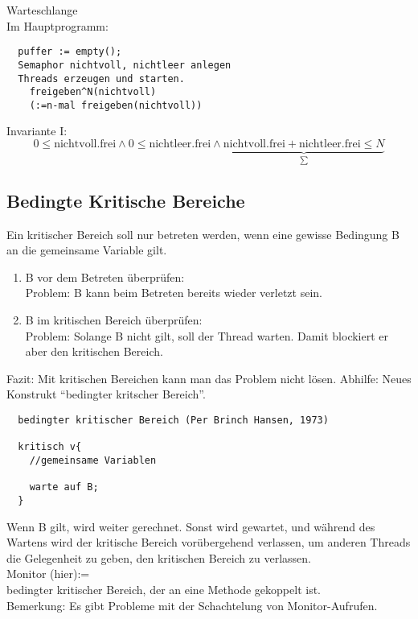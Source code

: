 \documentclass[a4paper,12pt]{scrartcl}
\begin{document}
Warteschlange\\


Im Hauptprogramm:
\begin{lstlisting}
  puffer := empty();
  Semaphor nichtvoll, nichtleer anlegen
  Threads erzeugen und starten.
    freigeben^N(nichtvoll)
    (:=n-mal freigeben(nichtvoll))
\end{lstlisting}

Invariante I:
$$ 0\leq \text{nichtvoll.frei} \wedge 0\leq\text{nichtleer.frei} \wedge \underbrace{\text{nichtvoll.frei} + \text{nichtleer.frei} \leq N}_{\sum}$$

\subsection{Bedingte Kritische Bereiche}

Ein kritischer Bereich soll nur betreten werden, wenn eine gewisse Bedingung B an die gemeinsame Variable gilt.
\begin{enumerate}
 \item B vor dem Betreten überprüfen:\\
 Problem: B kann beim Betreten bereits wieder verletzt sein.
 \item B im kritischen Bereich überprüfen:\\
 Problem: Solange B nicht gilt, soll der Thread warten. Damit blockiert er aber den kritischen Bereich.
 \end{enumerate}
 Fazit: Mit kritischen Bereichen kann man das Problem nicht lösen. Abhilfe: Neues Konstrukt "`bedingter kritscher Bereich"'.
 \begin{lstlisting}
  bedingter kritischer Bereich (Per Brinch Hansen, 1973)
  
  kritisch v{
    //gemeinsame Variablen
    
    warte auf B;
  }
 \end{lstlisting}

 Wenn B gilt, wird weiter gerechnet. Sonst wird gewartet, und während des Wartens wird der kritische Bereich vorübergehend verlassen, um anderen Threads die Gelegenheit zu geben, den kritischen Bereich zu verlassen.\\
 Monitor (hier):=\\
 bedingter kritischer Bereich, der an eine Methode gekoppelt ist.\\
 Bemerkung: Es gibt Probleme mit der Schachtelung von Monitor-Aufrufen.
 
\end{document}
